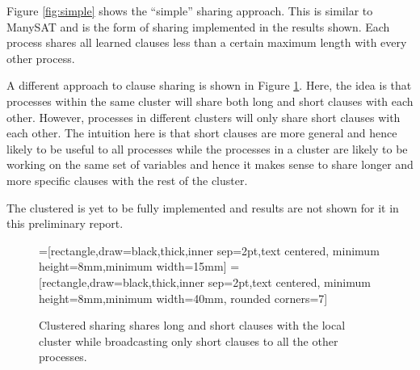 \documentclass[letterpaper, compsoc, conference]{IEEEtran}
\begin{document}
Figure \ref{fig:simple} shows the ``simple'' sharing approach. This is similar
to ManySAT and is the form of sharing implemented in the results shown. Each
process shares all learned clauses less than a certain maximum length with
every other process.

A different approach to clause sharing is shown in Figure \ref{fig:cluster}.
Here, the idea is that processes within the same cluster will share both long
and short clauses with each other. However, processes in different clusters
will only share short clauses with each other. The intuition here is that short
clauses are more general and hence likely to be useful to all processes while
the processes in a cluster are likely to be working on the same set of
variables and hence it makes sense to share longer and more specific clauses
with the rest of the cluster.

The clustered is yet to be fully implemented and results are not shown for it
in this preliminary report.
\begin{figure}[htbp]
    =[rectangle,draw=black,thick,inner sep=2pt,text centered,
                     minimum height=8mm,minimum width=15mm]
    =[rectangle,draw=black,thick,inner sep=2pt,text centered,
                        minimum height=8mm,minimum width=40mm, rounded corners=7]
    \begin{center}
    \end{center}
    \caption{Clustered sharing shares long and short clauses with the local cluster 
             while broadcasting only short clauses to all the other processes.}
    \label{fig:cluster}
 \end{figure}
\end{document}
